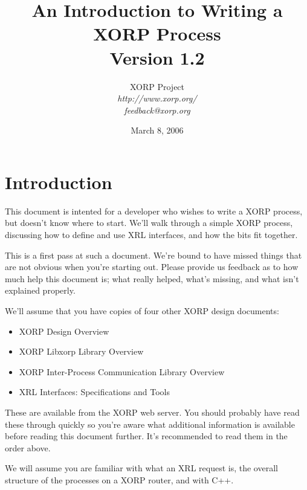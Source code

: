 \documentclass[11pt]{article}
\begin{document}
\title{An Introduction to Writing a XORP Process \\
\vspace{1ex}
Version 1.2}
\author{ XORP Project					\\
         {\it http://www.xorp.org/}			\\
	 {\it feedback@xorp.org}
}
\date{March 8, 2006}

\maketitle

\thispagestyle{empty}
\tableofcontents

\newpage
\section{Introduction}

This document is intented for a developer who wishes to write a XORP
process, but doesn't know where to start.  We'll walk through a simple
XORP process, discussing how to define and use XRL interfaces, and how
the bits fit together.  

This is a first pass at such a document.  We're bound to have missed
things that are not obvious when you're starting out.  Please provide
us feedback as to how much help this document is; what really helped,
what's missing, and what isn't explained properly.

We'll assume that you have copies of four other XORP design documents:
\begin{itemize}
\item XORP Design Overview\cite{xorp:design_arch}
\item XORP Libxorp Library Overview\cite{xorp:libxorp}
\item XORP Inter-Process Communication Library Overview\cite{xorp:xrl}
\item XRL Interfaces: Specifications and Tools\cite{xorp:xrl_interfaces}
\end{itemize}
These are available from the XORP web server.  You should probably
have read these through quickly so you're aware what additional
information is available before reading this document further.  It's
recommended to read them in the order above.  

We will assume you are familiar with what an XRL request is, the
overall structure of the processes on a XORP router, and with C++.
\end{document}
